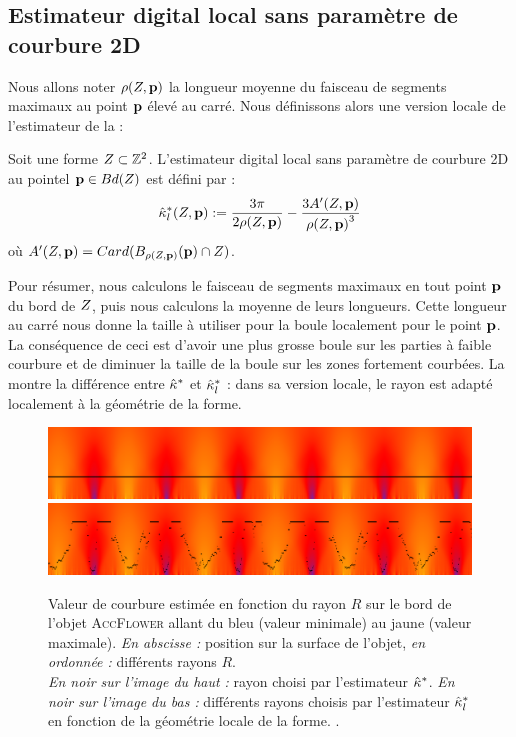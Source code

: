 \subsection{Estimateur digital local sans paramètre de courbure 2D}
%
Nous allons noter $\rho(Z,\mathbf{p})$ la longueur moyenne du faisceau de
segments maximaux au point $\mathbf{p}$ élevé au carré. Nous définissons alors une
version locale de l'estimateur de la
 :
%
\begin{definition}
  Soit une forme $Z \subset \mathbb{Z}^2$. L'estimateur digital local sans
  paramètre de courbure 2D au pointel $\mathbf{p} \in Bd({Z})$ est défini par :
  \begin{equation}
    \hat{\kappa}^{*}_{l}(Z, \mathbf{p}) := \frac{3\pi}{2 \rho(Z,\mathbf{p})} - \frac{3 A'(Z,\mathbf{p})}{{\rho(Z,\mathbf{p})}^3}
  \end{equation}
  où $A'(Z, \mathbf{p}) = Card(B_{\rho(Z,\mathbf{p})}(\mathbf{p}) \cap
  Z)$.
\end{definition}
%
Pour résumer, nous calculons le faisceau de segments maximaux en tout point
$\mathbf{p}$ du bord de $Z$, puis nous calculons la moyenne de leurs longueurs.
Cette longueur au carré nous donne la taille à utiliser pour la boule localement
pour le point $\mathbf{p}$. La conséquence de ceci est d'avoir une plus grosse boule
sur les parties à faible courbure et de diminuer la taille de la boule sur les
zones fortement courbées. La  montre la
différence entre $\hat{\kappa}^{*}$ et $\hat{\kappa}^{*}_{l}$ : dans sa version locale, le rayon est
adapté localement à la géométrie de la forme.
%
\begin{figure}[ht]{
  \begin{center}
    \includegraphics[width=.95\linewidth]{images/Curvature/ScaleSpace_Flower_Global}
    \includegraphics[width=.95\linewidth]{images/Curvature/ScaleSpace_Flower_Local}
  \end{center}}
  \caption[.]{Valeur de courbure estimée en fonction du rayon $R$ sur le bord de
  l'objet \textsc{AccFlower} allant du bleu (valeur minimale) au jaune (valeur
  maximale). \emph{En abscisse :} position sur la surface de l'objet, \emph{en
  ordonnée :} différents rayons $R$.
  \\
  \emph{En noir sur l'image du haut :} rayon choisi par l'estimateur $\hat{\kappa}^{*}$.
  \emph{En noir sur l'image du bas :} différents rayons choisis par l'estimateur
  $\hat{\kappa}^{*}_{l}$ en fonction de la géométrie locale de la forme.
  \label{fig:curvature-pf-radii}.}
\end{figure}
